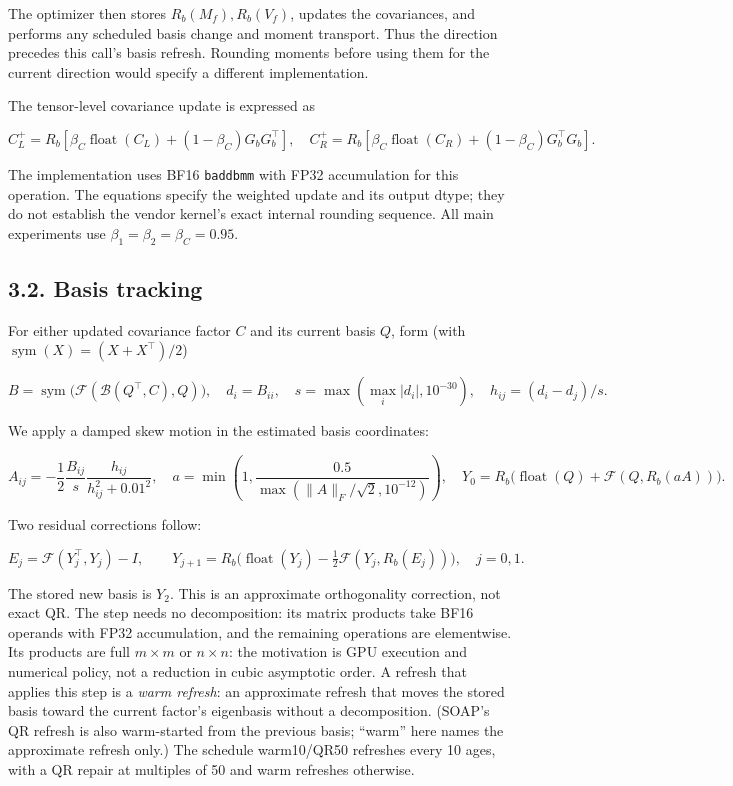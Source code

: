 The optimizer then stores \(R_b(M_f),R_b(V_f)\), updates the
covariances, and performs any scheduled basis change and moment
transport. Thus the direction precedes this call's basis refresh.
Rounding moments before using them for the current direction would
specify a different implementation.

The tensor-level covariance update is expressed as

\[
C_L^+=R_b\!\left[\beta_C\operatorname{float}(C_L)
 +(1-\beta_C)G_bG_b^\top\right],
\quad
C_R^+=R_b\!\left[\beta_C\operatorname{float}(C_R)
 +(1-\beta_C)G_b^\top G_b\right].
\]

The implementation uses BF16 \texttt{baddbmm} with FP32 accumulation for
this operation. The equations specify the weighted update and its output
dtype; they do not establish the vendor kernel's exact internal rounding
sequence. All main experiments use \(\beta_1=\beta_2=\beta_C=0.95\).

\hypertarget{basis-tracking}{%
\subsection{3.2. Basis tracking}\label{basis-tracking}}

For either updated covariance factor \(C\) and its current basis \(Q\),
form (with \(\operatorname{sym}(X)=(X+X^\top)/2\))

\[
B=\operatorname{sym}\bigl(\mathcal F(\mathcal B(Q^\top,C),Q)\bigr),
\quad d_i=B_{ii},\quad
s=\max(\max_i|d_i|,10^{-30}),\quad h_{ij}=(d_i-d_j)/s.
\]

We apply a damped skew motion in the estimated basis coordinates:

\[
A_{ij}=-\frac12\frac{B_{ij}}s\frac{h_{ij}}{h_{ij}^2+0.01^2},
\quad
a=\min\left(1,\frac{0.5}{\max(\|A\|_F/\sqrt2,10^{-12})}\right),
\quad
Y_0=R_b\bigl(\operatorname{float}(Q)+\mathcal F(Q,R_b(aA))\bigr).
\]

Two residual corrections follow:

\[
E_j=\mathcal F(Y_j^\top,Y_j)-I,\qquad
Y_{j+1}=R_b\bigl(\operatorname{float}(Y_j)
 -\tfrac12\mathcal F(Y_j,R_b(E_j))\bigr),\quad j=0,1.
\]

The stored new basis is \(Y_2\). This is an approximate orthogonality
correction, not exact QR. The step needs no decomposition: its matrix
products take BF16 operands with FP32 accumulation, and the remaining
operations are elementwise. Its products are full
\(m\times m\) or \(n\times n\): the motivation is GPU execution and
numerical policy, not a reduction in cubic asymptotic order. A refresh
that applies this step is a \emph{warm refresh}: an approximate
refresh that moves the stored basis toward the current factor's
eigenbasis without a decomposition. (SOAP's QR refresh is also
warm-started from the previous basis; ``warm'' here names the
approximate refresh only.) The schedule warm10/QR50 refreshes every 10
ages, with a QR repair at multiples of 50 and warm refreshes otherwise.

